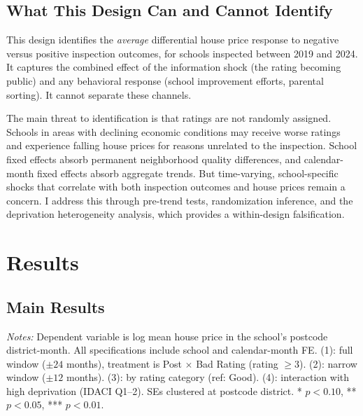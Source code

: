 \documentclass[12pt]{article}
\begin{document}
\subsection{What This Design Can and Cannot Identify}

This design identifies the \textit{average} differential house price response to negative versus positive inspection outcomes, for schools inspected between 2019 and 2024. It captures the combined effect of the information shock (the rating becoming public) and any behavioral response (school improvement efforts, parental sorting). It cannot separate these channels.

The main threat to identification is that ratings are not randomly assigned. Schools in areas with declining economic conditions may receive worse ratings and experience falling house prices for reasons unrelated to the inspection. School fixed effects absorb permanent neighborhood quality differences, and calendar-month fixed effects absorb aggregate trends. But time-varying, school-specific shocks that correlate with both inspection outcomes and house prices remain a concern. I address this through pre-trend tests, randomization inference, and the deprivation heterogeneity analysis, which provides a within-design falsification.

\section{Results}

\subsection{Main Results}

\begin{table}[H]
\centering
\caption{Effect of Negative Ofsted Rating on Log House Prices}
\label{tab:main}
\par\vspace{0.3em}
{\footnotesize \textit{Notes:} Dependent variable is log mean house price in the school's postcode district-month. All specifications include school and calendar-month FE. (1): full window ($\pm 24$ months), treatment is Post $\times$ Bad Rating (rating $\geq 3$). (2): narrow window ($\pm 12$ months). (3): by rating category (ref: Good). (4): interaction with high deprivation (IDACI Q1--2). SEs clustered at postcode district. * $p<0.10$, ** $p<0.05$, *** $p<0.01$.}
\end{table}
\end{document}
